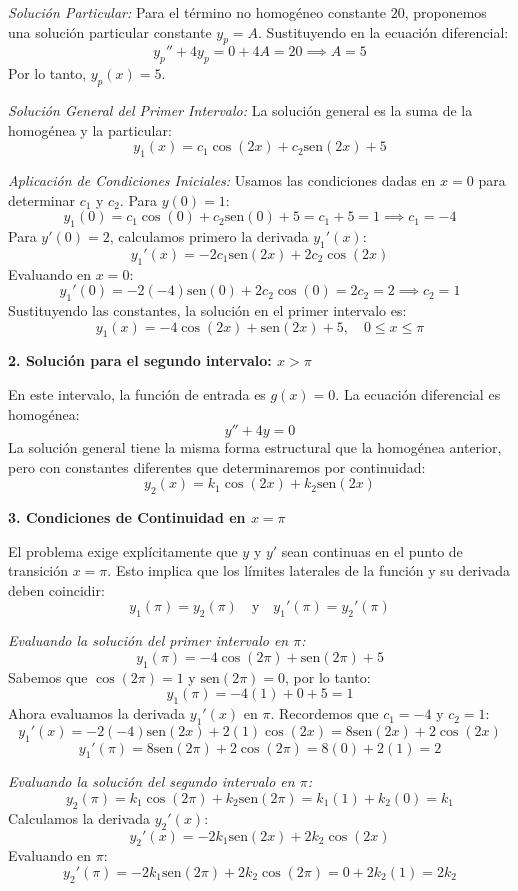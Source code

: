 \documentclass[a4paper]{article}
\begin{document}
\textit{Solución Particular:}
Para el término no homogéneo constante $20$, proponemos una solución particular constante $y_p = A$. Sustituyendo en la ecuación diferencial:
$$
y_p'' + 4y_p = 0 + 4A = 20 \implies A = 5
$$
Por lo tanto, $y_p(x) = 5$.

\textit{Solución General del Primer Intervalo:}
La solución general es la suma de la homogénea y la particular:
$$
y_1(x) = c_1 \cos(2x) + c_2 \text{sen}(2x) + 5
$$

\textit{Aplicación de Condiciones Iniciales:}
Usamos las condiciones dadas en $x = 0$ para determinar $c_1$ y $c_2$.
Para $y(0) = 1$:
$$
y_1(0) = c_1 \cos(0) + c_2 \text{sen}(0) + 5 = c_1 + 5 = 1 \implies c_1 = -4
$$
Para $y'(0) = 2$, calculamos primero la derivada $y_1'(x)$:
$$
y_1'(x) = -2c_1 \text{sen}(2x) + 2c_2 \cos(2x)
$$
Evaluando en $x = 0$:
$$
y_1'(0) = -2(-4) \text{sen}(0) + 2c_2 \cos(0) = 2c_2 = 2 \implies c_2 = 1
$$
Sustituyendo las constantes, la solución en el primer intervalo es:
$$
y_1(x) = -4 \cos(2x) + \text{sen}(2x) + 5, \quad 0 \leq x \leq \pi
$$

\textbf{2. Solución para el segundo intervalo: $x > \pi$}

En este intervalo, la función de entrada es $g(x) = 0$. La ecuación diferencial es homogénea:
$$
y'' + 4y = 0
$$
La solución general tiene la misma forma estructural que la homogénea anterior, pero con constantes diferentes que determinaremos por continuidad:
$$
y_2(x) = k_1 \cos(2x) + k_2 \text{sen}(2x)
$$

\textbf{3. Condiciones de Continuidad en $x = \pi$}

El problema exige explícitamente que $y$ y $y'$ sean continuas en el punto de transición $x = \pi$. Esto implica que los límites laterales de la función y su derivada deben coincidir:
$$
y_1(\pi) = y_2(\pi) \quad \text{y} \quad y_1'(\pi) = y_2'(\pi)
$$

\textit{Evaluando la solución del primer intervalo en $\pi$:}
$$
y_1(\pi) = -4 \cos(2\pi) + \text{sen}(2\pi) + 5
$$
Sabemos que $\cos(2\pi) = 1$ y $\text{sen}(2\pi) = 0$, por lo tanto:
$$
y_1(\pi) = -4(1) + 0 + 5 = 1
$$
Ahora evaluamos la derivada $y_1'(x)$ en $\pi$. Recordemos que $c_1 = -4$ y $c_2 = 1$:
$$
y_1'(x) = -2(-4) \text{sen}(2x) + 2(1) \cos(2x) = 8 \text{sen}(2x) + 2 \cos(2x)
$$
$$
y_1'(\pi) = 8 \text{sen}(2\pi) + 2 \cos(2\pi) = 8(0) + 2(1) = 2
$$

\textit{Evaluando la solución del segundo intervalo en $\pi$:}
$$
y_2(\pi) = k_1 \cos(2\pi) + k_2 \text{sen}(2\pi) = k_1(1) + k_2(0) = k_1
$$
Calculamos la derivada $y_2'(x)$:
$$
y_2'(x) = -2k_1 \text{sen}(2x) + 2k_2 \cos(2x)
$$
Evaluando en $\pi$:
$$
y_2'(\pi) = -2k_1 \text{sen}(2\pi) + 2k_2 \cos(2\pi) = 0 + 2k_2(1) = 2k_2
$$
\end{document}
